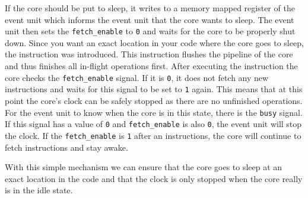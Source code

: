If the core should be put to sleep, it writes to a memory mapped register of the
event unit which informs the event unit that the core wants to sleep. The event
unit then sets the \texttt{fetch\_enable} to \texttt{0} and waits for the core
to be properly shut down.
Since you want an exact location in your code where the core goes to sleep, the
 instruction was introduced. This instruction flushes the
pipeline of the core and thus finishes all in-flight operations first. After
executing the  instruction the core checks the
\texttt{fetch\_enable} signal. If it is \texttt{0}, it does not fetch any new
instructions and waits for this signal to be set to \texttt{1} again. This means
that at this point the core's clock can be safely stopped as there are no
unfinished operations. For the event unit to know when the core is in this state,
there is the \texttt{busy} signal. If this signal has a value of \texttt{0} and
\texttt{fetch\_enable} is also \texttt{0}, the event unit will stop the clock.
If the \texttt{fetch\_enable} is \texttt{1} after an 
instructions, the core will continue to fetch instructions and stay awake.

With this simple mechanism we can ensure that the core goes to sleep at an exact
location in the code and that the clock is only stopped when the core really is
in the idle state.
